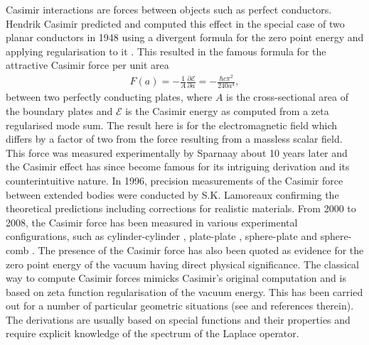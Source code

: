 Casimir interactions are forces between objects such as perfect conductors. Hendrik Casimir predicted and computed this effect in the special case of two planar 
conductors in 1948 using a divergent formula for the zero point energy and applying regularisation to it \cite{casimir1948attraction}. This resulted in the 
famous formula for the attractive Casimir force per unit area 
\begin{align*}
    F(a) = -\frac{1}{A}\frac{\partial \mathcal{E}}{\partial a} = -\frac{\hbar c\pi^{2}}{240a^{4}},
\end{align*}
between two perfectly conducting plates, where $A$ is the cross-sectional area of the boundary plates and $\mathcal{E}$ is the Casimir energy as 
computed from a zeta regularised mode sum. The result here is for the electromagnetic field which differs by a factor of two from the force resulting from a 
massless scalar field.
This force was measured experimentally by Sparnaay 
about 10 years later \cite{sparnaay1958measurements} and the Casimir effect has since become famous for its intriguing derivation and its counterintuitive nature.
In 1996, precision measurements of the Casimir force between 
 extended bodies were conducted by S.K. Lamoreaux \cite{lamoreaux1997demonstration}  confirming the theoretical predictions including corrections for 
realistic materials. From 2000 to 2008, the Casimir force has been measured in various 
experimental configurations, such as cylinder-cylinder \cite{ederth2000template}, plate-plate \cite{bressi2002measurement}, 
sphere-plate \cite{krause2007experimental} and sphere-comb \cite{chan2008measurement}. 
The presence of the Casimir force has also been quoted as evidence for the zero point energy of the vacuum having direct physical significance.
The classical way to compute Casimir forces mimicks Casimir's original computation and is based on zeta function regularisation of the vacuum energy. 
This has been carried out for a number of particular geometric situations (see \cite{bordag2001new, bordag2009advances, elizalde1989expressions, elizalde1990heat, kirsten2001spectral} and references therein). 
The derivations are usually based on special functions and their properties and require explicit knowledge of the spectrum of the Laplace operator.

